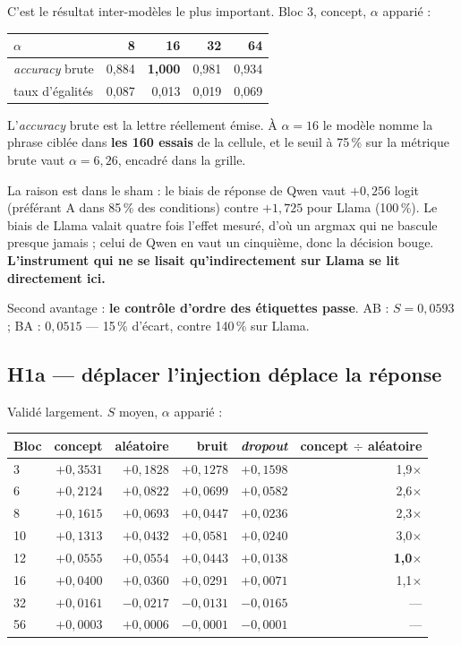\documentclass[a4paper,10pt]{article}
\newcommand{\pc}[1]{#1\,\%}
\begin{document}
C'est le résultat inter-modèles le plus important. Bloc 3, concept, $\alpha$ apparié :

\begin{center}\small
\begin{tabular}{lrrrr}
\toprule
$\alpha$ & 8 & \textbf{16} & 32 & 64 \\
\midrule
\emph{accuracy} brute & 0,884 & \textbf{1,000} & 0,981 & 0,934 \\
taux d'égalités & 0,087 & 0,013 & 0,019 & 0,069 \\
\bottomrule
\end{tabular}
\end{center}

L'\emph{accuracy} brute est la lettre réellement émise. À $\alpha = 16$ le modèle nomme la phrase
ciblée dans \textbf{les 160 essais} de la cellule, et le seuil à \pc{75} sur la métrique brute vaut
$\alpha = 6{,}26$, encadré dans la grille.

La raison est dans le sham : le biais de réponse de Qwen vaut $+0{,}256$ logit (préférant A dans
\pc{85} des conditions) contre $+1{,}725$ pour Llama (\pc{100}). Le biais de Llama valait quatre fois
l'effet mesuré, d'où un argmax qui ne bascule presque jamais ; celui de Qwen en vaut un cinquième,
donc la décision bouge. \textbf{L'instrument qui ne se lisait qu'indirectement sur Llama se lit
directement ici.}

Second avantage : \textbf{le contrôle d'ordre des étiquettes passe}. AB : $S = 0{,}0593$ ; BA :
$0{,}0515$ --- \pc{15} d'écart, contre \pc{140} sur Llama.

\subsection{H1a --- déplacer l'injection déplace la réponse}

Validé largement. $S$ moyen, $\alpha$ apparié :

\begin{center}\small
\begin{tabular}{lrrrrr}
\toprule
Bloc & concept & aléatoire & bruit & \emph{dropout} & concept $\div$ aléatoire \\
\midrule
3  & $+0{,}3531$ & $+0{,}1828$ & $+0{,}1278$ & $+0{,}1598$ & 1,9$\times$ \\
6  & $+0{,}2124$ & $+0{,}0822$ & $+0{,}0699$ & $+0{,}0582$ & 2,6$\times$ \\
8  & $+0{,}1615$ & $+0{,}0693$ & $+0{,}0447$ & $+0{,}0236$ & 2,3$\times$ \\
10 & $+0{,}1313$ & $+0{,}0432$ & $+0{,}0581$ & $+0{,}0240$ & 3,0$\times$ \\
12 & $+0{,}0555$ & $+0{,}0554$ & $+0{,}0443$ & $+0{,}0138$ & \textbf{1,0$\times$} \\
16 & $+0{,}0400$ & $+0{,}0360$ & $+0{,}0291$ & $+0{,}0071$ & 1,1$\times$ \\
32 & $+0{,}0161$ & $-0{,}0217$ & $-0{,}0131$ & $-0{,}0165$ & --- \\
56 & $+0{,}0003$ & $+0{,}0006$ & $-0{,}0001$ & $-0{,}0001$ & --- \\
\bottomrule
\end{tabular}
\end{center}
\end{document}
